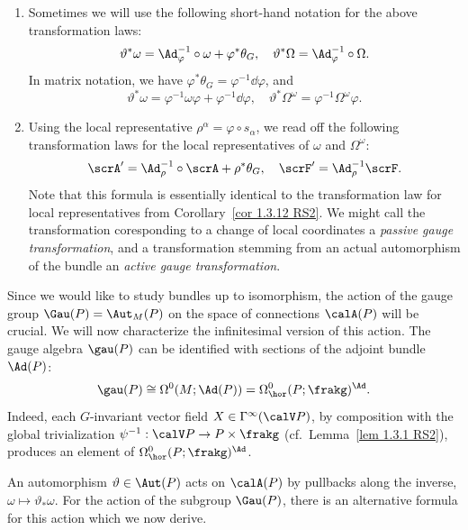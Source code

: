 \begin{rem}\label{rem 1.8.8 RS2}
    \begin{enumerate}
        \item Sometimes we will use the following short-hand notation for the above transformation laws:
        \[\vartheta^\ast\omega=\Ad_{\varphi}^{-1}\circ\omega+\varphi^\ast\theta_G,\quad \vartheta^\ast \Omega=\Ad_\varphi^{-1}\circ\Omega.\]
        In matrix notation, we have $\varphi^\ast\theta_G=\varphi^{-1}\dd\varphi$, and 
        \[\vartheta^\ast\omega=\varphi^{-1}\omega\varphi+\varphi^{-1}\dd\varphi,\quad \vartheta^\ast\Omega^\omega=\varphi^{-1}\Omega^\omega \varphi.\]
        \item Using the local representative $\rho^\alpha=\varphi\circ s_\alpha$, we read off the following transformation laws for the local representatives of $\omega$ and $\Omega^\omega$:
        \[\scrA'=\Ad_\rho^{-1}\circ\scrA+\rho^\ast\theta_G,\quad \scrF'=\Ad_\rho^{-1}\scrF.\]
        Note that this formula is essentially identical to the transformation law for local representatives from Corollary~\ref{cor 1.3.12 RS2}. We might call the transformation coresponding to a change of local coordinates a \emph{passive gauge transformation}, and a transformation stemming from an actual automorphism of the bundle an \emph{active gauge transformation}.
    \end{enumerate}
\end{rem}


Since we would like to study bundles up to isomorphism, the action of the gauge group $\Gau(P)=\Aut_M(P)$ on the space of connections $\calA(P)$ will be crucial. We will now characterize the infinitesimal version of this action. The gauge algebra $\gau(P)$ can be identified with sections of the adjoint bundle $\Ad(P)$: 
\[\gau(P)\cong \Omega^0(M;\Ad(P))=\Omega^0_{\hor}(P;\frakg)^\Ad.\]
Indeed, each $G$-invariant vector field $X\in\Gamma^\infty(\calV P)$, by composition with the global trivialization $\psi^{-1}:\calV P\to P\times\frakg$ (cf.\ Lemma~\ref{lem 1.3.1 RS2}), produces an element of $\Omega^0_{\hor}(P;\frakg)^\Ad$.

An automorphism $\vartheta\in\Aut(P)$ acts on $\calA(P)$ by pullbacks along the inverse, $\omega\mapsto \vartheta_\ast\omega$. For the action of the subgroup $\Gau(P)$, there is an alternative formula for this action which we now derive. 

